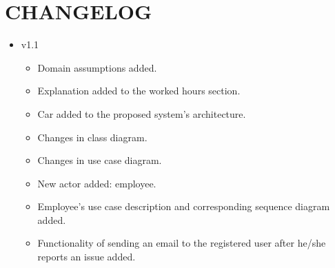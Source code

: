 \section{CHANGELOG}
\begin{itemize}
	\item v1.1
	\begin{itemize}
		\item Domain assumptions added.
		\item Explanation added to the worked hours section.
		\item Car added to the proposed system's architecture.
		\item Changes in class diagram.
		\item Changes in use case diagram.
		\item New actor added: employee.
		\item Employee's use case description and corresponding sequence diagram added.
		\item Functionality of sending an email to the registered user after he/she reports an issue added. 
	\end{itemize}
\end{itemize}